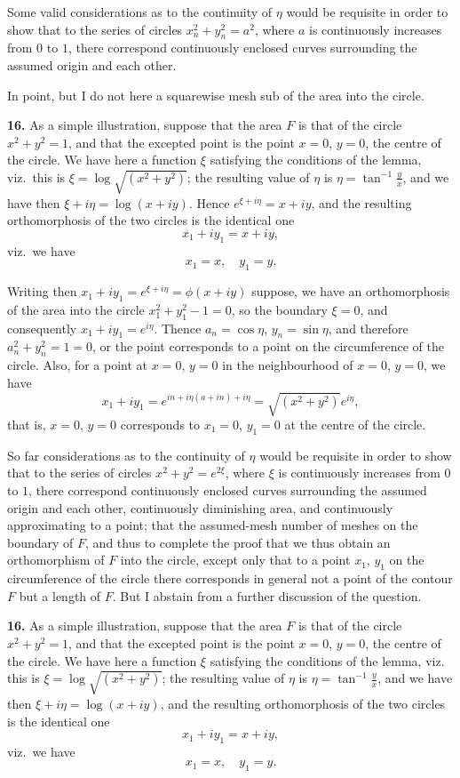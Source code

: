 \documentclass[11pt,a4paper]{article}
\begin{document}
Some valid considerations as to the continuity of $\eta$ would be requisite in order to show that to the series of circles $x_n^2 + y_n^2 = a^2$, where $a$ is continuously increases from $0$ to $1$, there correspond continuously enclosed curves surrounding the assumed origin and each other.

In point, but I do not here a squarewise mesh sub of the area into the circle.

\textbf{16.} As a simple illustration, suppose that the area $F$ is that of the circle $x^2 + y^2 = 1$, and that the excepted point is the point $x = 0$, $y = 0$, the centre of the circle. We have here a function $\xi$ satisfying the conditions of the lemma, viz.\ this is $\xi = \log \sqrt{(x^2 + y^2)}$; the resulting value of $\eta$ is $\eta = \tan^{-1}\frac{y}{x}$, and we have then $\xi + i \eta = \log (x + iy)$. Hence $e^{\xi + i \eta} = x + iy$, and the resulting orthomorphosis of the two circles is the identical one
\[
x_1 + iy_1 = x + iy,
\]
viz.\ we have
\[
x_1 = x, \quad y_1 = y.
\]

Writing then $x_1 + iy_1 = e^{\xi + i \eta} = \phi(x + iy)$ suppose, we have an orthomorphosis of the area into the circle $x_1^2 + y_1^2 - 1 = 0$, so the boundary $\xi = 0$, and consequently $x_1 + i y_1 = e^{i\eta}$. Thence $a_n = \cos \eta$, $y_n = \sin \eta$, and therefore $a_n^2 + y_n^2 = 1 = 0$, or the point corresponds to a point on the circumference of the circle. Also, for a point at $x = 0$, $y = 0$ in the neighbourhood of $x = 0$, $y = 0$, we have
\[
x_1 + i y_1 = e^{i n + i \eta(a + i n) + i \eta} = \sqrt{(x^2 + y^2)} e^{i\eta},
\]
that is, $x = 0$, $y = 0$ corresponds to $x_1 = 0$, $y_1 = 0$ at the centre of the circle.

So far considerations as to the continuity of $\eta$ would be requisite in order to show that to the series of circles $x^2 + y^2 = e^{2\xi}$, where $\xi$ is continuously increases from $0$ to $1$, there correspond continuously enclosed curves surrounding the assumed origin and each other, continuously diminishing area, and continuously approximating to a point; that the assumed-mesh number of meshes on the boundary of $F$, and thus to complete the proof that we thus obtain an orthomorphism of $F$ into the circle, except only that to a point $x_1$, $y_1$ on the circumference of the circle there corresponds in general not a point of the contour $F$ but a length of $F$. But I abstain from a further discussion of the question.

\textbf{16.} As a simple illustration, suppose that the area $F$ is that of the circle $x^2 + y^2 = 1$, and that the excepted point is the point $x = 0$, $y = 0$, the centre of the circle. We have here a function $\xi$ satisfying the conditions of the lemma, viz. this is $\xi = \log \sqrt{(x^2 + y^2)}$; the resulting value of $\eta$ is $\eta = \tan^{-1}\frac{y}{x}$, and we have then $\xi + i\eta = \log (x + iy)$, and the resulting orthomorphosis of the two circles is the identical one
\[
x_1 + iy_1 = x + iy,
\]
viz.\ we have
\[
x_1 = x, \quad y_1 = y.
\]
\end{document}
